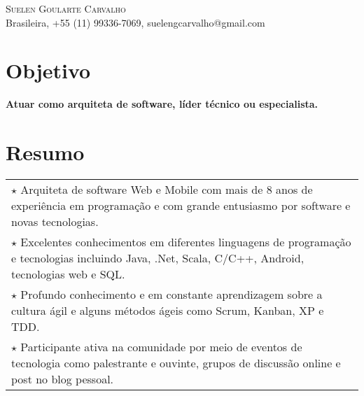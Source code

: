 \documentclass[a4paper, oneside, final]{scrartcl}
\newcommand{\vspc}{\vspace{0.15cm}} %
\begin{document}
\begin{center}
\textsc{\Huge{Suelen Goularte Carvalho}} \vspc\\
{\small Brasileira, +55 (11) 99336-7069, suelengcarvalho@gmail.com} 


\section{Objetivo}
	{\bf Atuar como arquiteta de software, líder técnico ou especialista.}



\section{Resumo}
\begin{tabularx}{1\linewidth}{X}
	$\star$ Arquiteta de software Web e Mobile com mais de 8 anos de experiência em programação e com grande entusiasmo por software e novas tecnologias. \vspc\\
	
	$\star$ Excelentes conhecimentos em diferentes linguagens de programação e tecnologias incluindo Java, .Net, Scala, C/C++, Android, tecnologias web e SQL. \vspc\\
	
	$\star$ Profundo conhecimento e em constante aprendizagem sobre a cultura ágil e alguns métodos ágeis como Scrum, Kanban, XP e TDD. \vspc\\
	
	$\star$ Participante ativa na comunidade por meio de eventos de tecnologia como palestrante e ouvinte, grupos de discussão online e post no blog pessoal. \vspc\\	
\end{tabularx}


\end{center}
\end{document}
